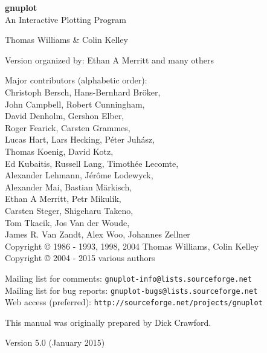 \documentclass[twoside]{article}
\def\gnuplotVersion{\usebox\GpVersion}
\begin{document}
\sloppy
\thispagestyle{empty}
\rule{0in}{1.0in}

  \begin{center}

  {\huge\bf {gnuplot \gpVersion}}\\
  \vspace{3ex}
  {\Large An Interactive Plotting Program}\\

  \vspace{2ex}

  \large
  Thomas Williams \& Colin Kelley\\

  \vspace{2ex}

  Version
    \gnuplotVersion
  organized by: Ethan A Merritt and many others\\

   \vspace{2ex}

  Major contributors (alphabetic order):\\

  Christoph Bersch,
  Hans-Bernhard Bröker,\\
  John Campbell,
  Robert Cunningham,\\
  David Denholm,
  Gershon Elber,\\
  Roger Fearick,
  Carsten Grammes,\\
  Lucas Hart,
  Lars Hecking,
  Péter Juhász,\\
  Thomas Koenig,
  David Kotz,\\
  Ed Kubaitis,
  Russell Lang,
  Timothée Lecomte,\\
  Alexander Lehmann,
  Jérôme Lodewyck,\\
  Alexander Mai,
  Bastian Märkisch, \\
  Ethan A Merritt,
  Petr Mikulík,\\
  Carsten Steger,
  Shigeharu Takeno,\\
  Tom Tkacik,
  Jos Van der Woude,\\
  James R. Van Zandt,
  Alex Woo,
  Johannes Zellner\\
  Copyright {\copyright} 1986 - 1993, 1998, 2004   Thomas Williams, Colin Kelley\\
  Copyright {\copyright} 2004 - 2015  various authors\\

  \vspace{2ex}

  Mailing list for comments: \verb+gnuplot-info@lists.sourceforge.net+\\
  Mailing list for bug reports: \verb+gnuplot-bugs@lists.sourceforge.net+\\
  Web access (preferred): \verb+http://sourceforge.net/projects/gnuplot+

  \vfill
  This manual was originally prepared by Dick Crawford. \\

  \vspace{2ex}

   Version 5.0 (January 2015)

   \end{center}
\newpage


\hypertarget{TableOfContents}{}
\tableofcontents

\newpage
\end{document}

